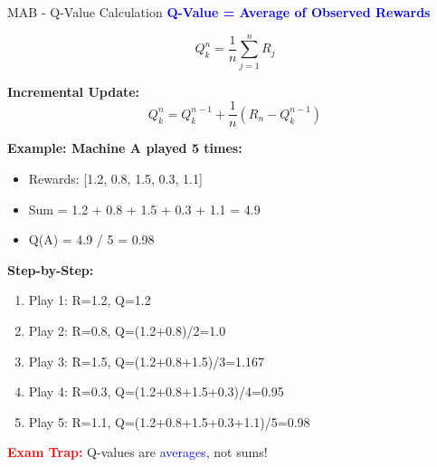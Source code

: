 \documentclass[8pt]{beamer}
\begin{document}
	\begin{frame}{MAB - Q-Value Calculation}
		\fontsize{6.5}{7.5}\selectfont
		\textcolor{blue}{\textbf{Q-Value = Average of Observed Rewards}}
		
		\[
		Q_k^n = \frac{1}{n}\sum_{j=1}^n R_j
		\]
		
		\textbf{Incremental Update:}
		\[
		Q_k^n = Q_k^{n-1} + \frac{1}{n}(R_n - Q_k^{n-1})
		\]
		
		\textbf{Example: Machine A played 5 times:}
		\begin{itemize}
			\item Rewards: [1.2, 0.8, 1.5, 0.3, 1.1]
			\item Sum = 1.2 + 0.8 + 1.5 + 0.3 + 1.1 = 4.9
			\item Q(A) = 4.9 / 5 = 0.98
		\end{itemize}
		
		\textbf{Step-by-Step:}
		\begin{enumerate}
			\item Play 1: R=1.2, Q=1.2
			\item Play 2: R=0.8, Q=(1.2+0.8)/2=1.0
			\item Play 3: R=1.5, Q=(1.2+0.8+1.5)/3=1.167
			\item Play 4: R=0.3, Q=(1.2+0.8+1.5+0.3)/4=0.95
			\item Play 5: R=1.1, Q=(1.2+0.8+1.5+0.3+1.1)/5=0.98
		\end{enumerate}
		
		\textcolor{red}{\textbf{Exam Trap:}} Q-values are \textcolor{blue}{averages}, not sums!
	\end{frame}
	
\end{document}
